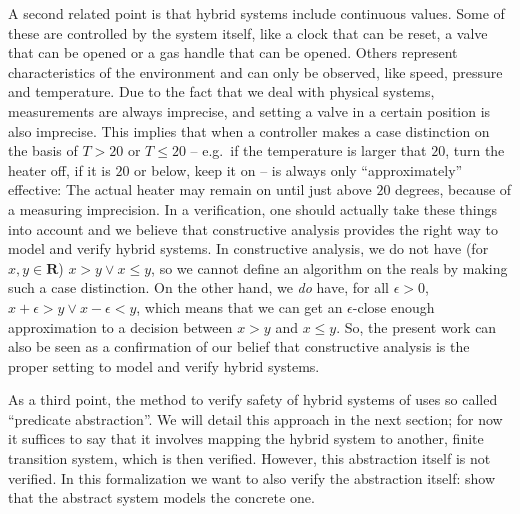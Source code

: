 \documentclass[runningheads]{llncs}
\newcommand{\IR}{{\mathbf R}}
\begin{document}
A second related point is that hybrid systems include continuous
values. Some of these are controlled by the system itself, like a
clock that can be reset, a valve that can be opened or a gas handle
that can be opened. Others represent characteristics of the
environment and can only be observed, like speed, pressure and
temperature. Due to the fact that we deal with physical systems,
measurements are always imprecise, and setting a valve in a certain
position %
is also imprecise. 
This implies that when a controller makes a case distinction on the
basis of $T>20$ or $T\leq 20$ -- e.g.\ if the temperature is larger
that $20$, turn the heater off, if it is $20$ or below, keep it on --
is always only ``approximately'' effective: The actual heater may
remain on until just above $20$ degrees, because of a measuring
imprecision. In a verification, one should actually take these things
into account and we believe that constructive analysis provides the
right way to model and verify hybrid systems. In constructive
analysis, we do not have (for $x,y\in\IR$) $x>y \vee x\leq y$, so we
cannot define an algorithm on the reals by making such a case
distinction. On the other hand, we {\em do\/} have, for all
$\epsilon>0$, $x+\epsilon>y \vee x-\epsilon< y$, which means that we
can get an $\epsilon$-close enough approximation to a decision between
$x>y$ and $x\leq y$.  So, the present work can also be seen as a
confirmation of our belief that constructive analysis is the
proper setting to model and verify hybrid systems.

As a third point, the method to verify safety of hybrid systems of
\cite{alur} uses so called ``predicate abstraction''. We will detail
this approach in the next section; for now it suffices to say that it
involves mapping the hybrid system to another, finite transition
system, which is then verified. However, this abstraction itself is
not verified. In this formalization we want to also verify the
abstraction itself: show that the abstract system models the concrete
one.


\end{document}
